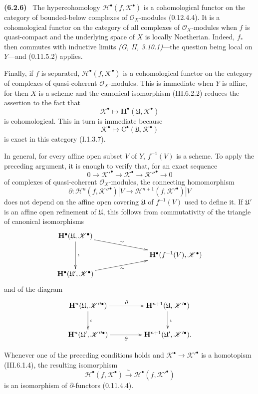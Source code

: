 \documentclass[10pt,oneside]{book}
\newcommand{\sh}[1]{\mathscr{#1}}
\newcommand{\sref}[2][]{(#2)}
\newcommand{\oldpage}[2][]{\setcounter{footnote}{0}\marginpar{\scriptsize\textbf{#1}~|~#2}\ignorespaces}
\newenvironment{env}[1][]{\par\medskip\noindent\textbf{(#1)}\ }{\par}
\begin{document}
\begin{env}[6.2.6]
\label{III.6.2.6}
The hypercohomology
$\mathcal{H}^\bullet(f,\sh{K}^\bullet)$ is a cohomological functor
on the category of bounded-below complexes of $\sh{O}_X$-modules
\sref[0]{0.12.4.4}.  It is a cohomological functor on the category
of all complexes of $\sh{O}_X$-modules when $f$ is quasi-compact
and the underlying space of $X$ is locally Noetherian.  Indeed,
$f_*$ then commutes with inductive limits
\emph{(G, II, 3.10.1)}---the question being local on $Y$---and
\sref[0]{0.11.5.2} applies.

Finally, if $f$ is separated,
$\mathcal{H}^\bullet(f,\sh{K}^\bullet)$ is a cohomological functor
on the category of complexes of quasi-coherent
$\sh{O}_X$-modules.  This is immediate when $Y$ is affine, for
then $X$ is a scheme and the canonical isomorphism
\sref{III.6.2.2} reduces the assertion to the fact that
\[
  \sh{K}^\bullet\longmapsto
  \mathbf{H}^\bullet(\mathfrak{U},\sh{K}^\bullet)
\]
is cohomological.  This in turn is immediate because
\[
  \sh{K}^\bullet\longmapsto
  \mathrm{C}^\bullet(\mathfrak{U},\sh{K}^\bullet)
\]
is exact in this category \sref[I]{I.1.3.7}.

In general, for every affine open subset $V$ of $Y$,
\oldpage[III]{141}
$f^{-1}(V)$ is a scheme.  To apply the preceding argument, it is
enough to verify that, for an exact sequence
\[
  0\longrightarrow\sh{K}'^\bullet
  \longrightarrow\sh{K}^\bullet
  \longrightarrow\sh{K}''^\bullet
  \longrightarrow0
\]
of complexes of quasi-coherent $\sh{O}_X$-modules, the connecting
homomorphism
\[
  \partial:
  \mathcal{H}^n(f,\sh{K}''^\bullet)|V
  \longrightarrow
  \mathcal{H}^{n+1}(f,\sh{K}'^\bullet)|V
\]
does not depend on the affine open covering $\mathfrak{U}$ of
$f^{-1}(V)$ used to define it.  If $\mathfrak{U}'$ is an affine
open refinement of $\mathfrak{U}$, this follows from commutativity
of the triangle of canonical isomorphisms
\[
  \xymatrix@C=34pt@R=11pt{
    \mathbf{H}^\bullet(\mathfrak{U},\sh{K}^\bullet)
      \ar[rrd]^-{\sim}
      \ar[dd]^{\iota}
    && \\
    &&
    \mathbf{H}^\bullet(f^{-1}(V),\sh{K}^\bullet)
    \\
    \mathbf{H}^\bullet(\mathfrak{U}',\sh{K}^\bullet)
      \ar[rru]_-{\sim}
    &&
  }
\]
and of the diagram
\[
  \xymatrix@C=46pt@R=25pt{
    \mathbf{H}^n(\mathfrak{U},\sh{K}''^\bullet)
      \ar[r]^-{\partial}
      \ar[d]^{\iota}
    &
    \mathbf{H}^{n+1}(\mathfrak{U},\sh{K}'^\bullet)
      \ar[d]^{\iota}
    \\
    \mathbf{H}^n(\mathfrak{U}',\sh{K}''^\bullet)
      \ar[r]_-{\partial}
    &
    \mathbf{H}^{n+1}(\mathfrak{U}',\sh{K}'^\bullet).
  }
\]

Whenever one of the preceding conditions holds and
$\sh{K}^\bullet\to\sh{K}'^\bullet$ is a homotopism
\sref{III.6.1.4}, the resulting isomorphism
\[
  \mathcal{H}^\bullet(f,\sh{K}^\bullet)
  \xrightarrow{\ \sim\ }
  \mathcal{H}^\bullet(f,\sh{K}'^\bullet)
\]
is an isomorphism of $\partial$-functors
\sref[0]{0.11.4.4}.
\end{env}
\end{document}
